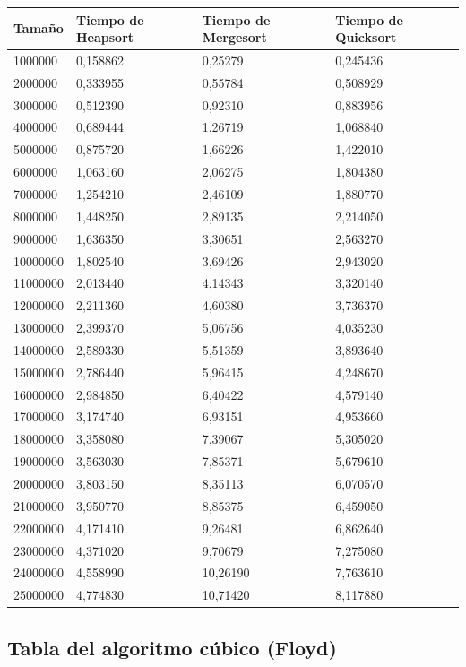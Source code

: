 \documentclass[a4paper, 11pt]{article}
\begin{document}
\begin{tabular}{|l|l|l|l|}
	\hline
	Tamaño & Tiempo de Heapsort & Tiempo de Mergesort & Tiempo de Quicksort \\
	\hline
	\hline
	1000000	&0,158862&	0,25279&	0,245436\\
	\hline
	2000000	&0,333955&	0,55784	&0,508929\\
	\hline
	3000000	&0,512390&	0,92310	&0,883956\\
	\hline
	4000000	&0,689444&	1,26719	&1,068840\\
	\hline
	5000000	&0,875720&	1,66226	&1,422010\\
	\hline
	6000000	&1,063160&	2,06275	&1,804380\\
	\hline
	7000000	&1,254210&	2,46109	&1,880770\\
	\hline
	8000000	&1,448250&	2,89135	&2,214050\\
	\hline
	9000000	&1,636350&	3,30651	&2,563270\\
	\hline
	10000000	&1,802540&	3,69426	&2,943020\\
	\hline
	11000000	&2,013440&	4,14343	&3,320140\\
	\hline
	12000000	&2,211360&	4,60380	&3,736370\\
	\hline
	13000000	&2,399370&	5,06756	&4,035230\\
	\hline
	14000000	&2,589330&	5,51359	&3,893640\\
	\hline
	15000000	&2,786440&	5,96415	&4,248670\\
	\hline
	16000000	&2,984850&	6,40422	&4,579140\\
	\hline
	17000000	&3,174740&	6,93151	&4,953660\\
	\hline
	18000000	&3,358080&	7,39067	&5,305020\\
	\hline
	19000000	&3,563030&	7,85371	&5,679610\\
	\hline
	20000000	&3,803150&	8,35113	&6,070570\\
	\hline
	21000000	&3,950770&	8,85375	&6,459050\\
	\hline
	22000000	&4,171410&	9,26481	&6,862640\\
	\hline
	23000000	&4,371020&	9,70679	&7,275080\\
	\hline
	24000000	&4,558990&	10,26190	&7,763610\\
	\hline
	25000000	&4,774830&	10,71420	&8,117880\\
	\hline
\end{tabular}

\subsection{Tabla del algoritmo cúbico (Floyd)}
   
\end{document}
